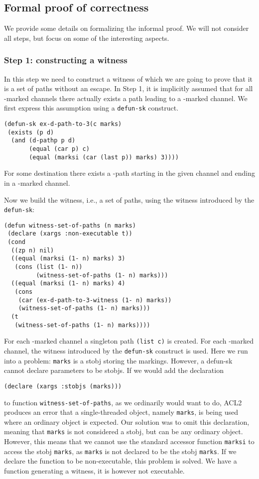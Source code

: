 \documentclass[submission,copyright]{eptcs}
\begin{document}
\subsection{Formal proof of correctness}

We provide some details on formalizing the informal proof. We will not consider all steps, but focus on some of the interesting aspects.

\subsubsection{Step 1: constructing a witness}
In this step we need to construct a witness  of which we are going to prove that it is a set of paths without an escape. In Step 1, it is implicitly assumed that for all -marked channels
 there actually exists a path leading to a -marked channel. We first express this assumption using a {\tt defun-sk} construct.
\begin{verbatim}
(defun-sk ex-d-path-to-3(c marks)
 (exists (p d)
  (and (d-pathp p d)
       (equal (car p) c)
       (equal (marksi (car (last p)) marks) 3))))
\end{verbatim}
For some destination  there exists a -path  starting in the given channel  and ending in a -marked channel. 

Now we build the witness, i.e., a set of paths, using the witness introduced by the {\tt defun-sk}:
\begin{verbatim}
(defun witness-set-of-paths (n marks)
 (declare (xargs :non-executable t))
 (cond
  ((zp n) nil)
  ((equal (marksi (1- n) marks) 3)
   (cons (list (1- n))
         (witness-set-of-paths (1- n) marks)))
  ((equal (marksi (1- n) marks) 4)
   (cons
    (car (ex-d-path-to-3-witness (1- n) marks))
    (witness-set-of-paths (1- n) marks)))
  (t
   (witness-set-of-paths (1- n) marks))))
\end{verbatim}
For each -marked channel a singleton path {\tt (list c)} is created. For each -marked channel, the witness introduced by the {\tt defun-sk} construct is used.
Here we run into a problem: {\tt marks} is a stobj storing the markings. However, a defun-sk cannot declare parameters to be stobjs. If we would add the declaration
\begin{verbatim}
(declare (xargs :stobjs (marks)))
\end{verbatim}
to function {\tt witness-set-of-paths}, as we ordinarily would want to do, ACL2 produces an error that a single-threaded object, namely {\tt marks}, is being used where an ordinary object is expected.
 Our solution was to omit this declaration, meaning that {\tt marks} is not considered a stobj, but can be any ordinary object. However, this means that we cannot use the standard accessor function {\tt marksi} to access the stobj {\tt marks}, as {\tt marks} is not declared to be the stobj {\tt marks}. If we declare the function to be non-executable, this problem is solved. We have a function generating a witness, it is however not executable.
\end{document}
